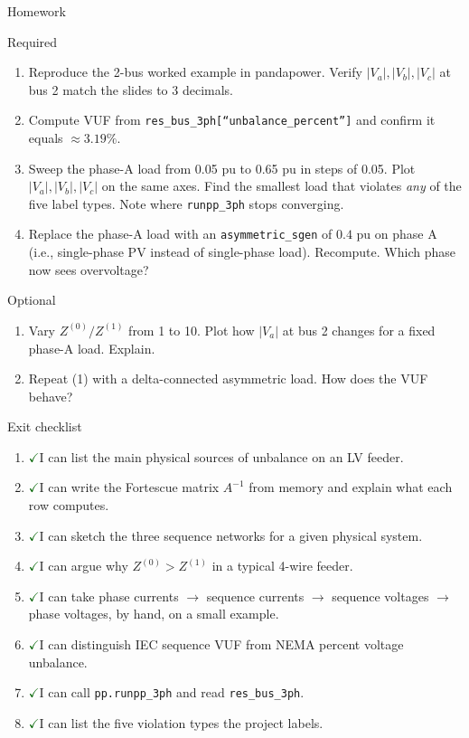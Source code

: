 \documentclass[aspectratio=169,10pt]{beamer}
\newcommand{\code}[1]{\texttt{#1}}
\newcommand{\checkitem}{\textcolor{darkgreen}{\Large$\checkmark$}\;}
\begin{document}
\begin{frame}{Homework}
\begin{block}{Required}
\begin{enumerate}
  \item Reproduce the 2-bus worked example in pandapower. Verify $|V_a|, |V_b|, |V_c|$ at bus 2 match the slides to 3 decimals.
  \item Compute VUF from \code{res\_bus\_3ph[``unbalance\_percent'']} and confirm it equals $\approx 3.19\%$.
  \item Sweep the phase-A load from 0.05 pu to 0.65 pu in steps of 0.05. Plot $|V_a|, |V_b|, |V_c|$ on the same axes. Find the smallest load that violates \emph{any} of the five label types. Note where \code{runpp\_3ph} stops converging.
  \item Replace the phase-A load with an \code{asymmetric\_sgen} of $0.4$ pu on phase A (i.e., single-phase PV instead of single-phase load). Recompute. Which phase now sees overvoltage?
\end{enumerate}
\end{block}
\begin{block}{Optional}
\begin{enumerate}
  \item Vary $Z^{(0)}/Z^{(1)}$ from 1 to 10. Plot how $|V_a|$ at bus 2 changes for a fixed phase-A load. Explain.
  \item Repeat (1) with a delta-connected asymmetric load. How does the VUF behave?
\end{enumerate}
\end{block}
\end{frame}

\begin{frame}{Exit checklist}
\begin{enumerate}
  \item \checkitem I can list the main physical sources of unbalance on an LV feeder.
  \item \checkitem I can write the Fortescue matrix $A^{-1}$ from memory and explain what each row computes.
  \item \checkitem I can sketch the three sequence networks for a given physical system.
  \item \checkitem I can argue why $Z^{(0)} > Z^{(1)}$ in a typical 4-wire feeder.
  \item \checkitem I can take phase currents $\to$ sequence currents $\to$ sequence voltages $\to$ phase voltages, by hand, on a small example.
  \item \checkitem I can distinguish IEC sequence VUF from NEMA percent voltage unbalance.
  \item \checkitem I can call \code{pp.runpp\_3ph} and read \code{res\_bus\_3ph}.
  \item \checkitem I can list the five violation types the project labels.
\end{enumerate}
\end{frame}
\end{document}
